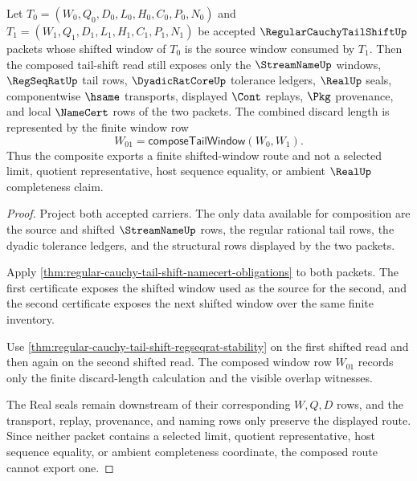\begin{theorem}
\label{thm:regular-cauchy-tail-shift-window-composition}
Let $T_0=(W_0,Q_0,D_0,L_0,H_0,C_0,P_0,N_0)$ and $T_1=(W_1,Q_1,D_1,L_1,H_1,C_1,P_1,N_1)$ be accepted $\RegularCauchyTailShiftUp$ packets whose shifted window of $T_0$ is the source window consumed by $T_1$. Then the composed tail-shift read still exposes only the $\StreamNameUp$ windows, $\RegSeqRatUp$ tail rows, $\DyadicRatCoreUp$ tolerance ledgers, $\RealUp$ seals, componentwise $\hsame$ transports, displayed $\Cont$ replays, $\Pkg$ provenance, and local $\NameCert$ rows of the two packets. The combined discard length is represented by the finite window row
$$
W_{01}=\mathsf{composeTailWindow}(W_0,W_1).
$$
Thus the composite exports a finite shifted-window route and not a selected limit, quotient representative, host sequence equality, or ambient $\RealUp$ completeness claim.
\end{theorem}
\begin{proof}
Project both accepted carriers. The only data available for composition are the source and shifted $\StreamNameUp$ rows, the regular rational tail rows, the dyadic tolerance ledgers, and the structural rows displayed by the two packets.

Apply \autoref{thm:regular-cauchy-tail-shift-namecert-obligations} to both packets. The first certificate exposes the shifted window used as the source for the second, and the second certificate exposes the next shifted window over the same finite inventory.

Use \autoref{thm:regular-cauchy-tail-shift-regseqrat-stability} on the first shifted read and then again on the second shifted read. The composed window row $W_{01}$ records only the finite discard-length calculation and the visible overlap witnesses.

The Real seals remain downstream of their corresponding $W,Q,D$ rows, and the transport, replay, provenance, and naming rows only preserve the displayed route. Since neither packet contains a selected limit, quotient representative, host sequence equality, or ambient completeness coordinate, the composed route cannot export one.
\end{proof}


